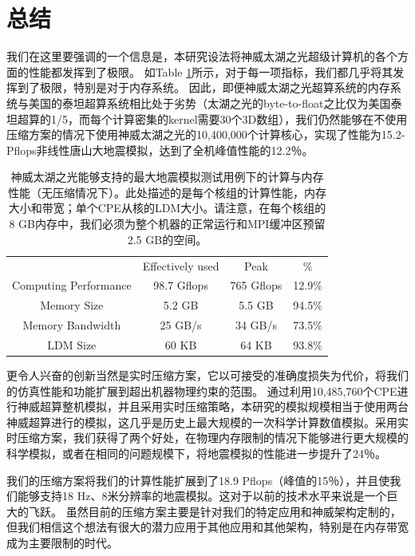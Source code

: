 \documentclass[degree=doctor]{thuthesis}
\begin{document}
\section{总结}

我们在这里要强调的一个信息是，本研究设法将神威太湖之光超级计算机的各个方面的性能都发挥到了极限。 如Table \ref{tb:push-limit}所示，对于每一项指标，我们都几乎将其发挥到了极限，特别是对于内存系统。 因此，即便神威太湖之光超算系统的内存系统与美国的泰坦超算系统相比处于劣势（太湖之光的byte-to-float之比仅为美国泰坦超算的1/5，而每个计算密集的kernel需要30个3D数组），我们仍然能够在不使用压缩方案的情况下使用神威太湖之光的10,400,000个计算核心，实现了性能为15.2-Pflops非线性唐山大地震模拟，达到了全机峰值性能的12.2％。

\begin{table}[!t]
\caption{
神威太湖之光能够支持的最大地震模拟测试用例下的计算与内存性能（无压缩情况下）。此处描述的是每个核组的计算性能，内存大小和带宽；单个CPE从核的LDM大小。请注意，在每个核组的8 GB内存中，我们必须为整个机器的正常运行和MPI缓冲区预留2.5 GB的空间。}
\label{tb:push-limit}
\centering
\begin{tabular}{cccc}
\hline\hline
  & Effectively used & Peak & \% \\

  Computing Performance & 98.7 Gflops & 765 Gflops & 12.9\% \\
  Memory Size & 5.2 GB & 5.5 GB & 94.5\% \\
  Memory Bandwidth & 25 GB/s & 34 GB/s & 73.5\% \\
  LDM Size & 60 KB & 64 KB & 93.8\% \\\hline
\hline
\end{tabular}
\end{table}

更令人兴奋的创新当然是实时压缩方案，它以可接受的准确度损失为代价，将我们的仿真性能和功能扩展到超出机器物理约束的范围。 通过利用10,485,760个CPE进行神威超算整机模拟，并且采用实时压缩策略，本研究的模拟规模相当于使用两台神威超算进行的模拟，这几乎是历史上最大规模的一次科学计算数值模拟。采用实时压缩方案，我们获得了两个好处，在物理内存限制的情况下能够进行更大规模的科学模拟，或者在相同的问题规模下，将地震模拟的性能进一步提升了24％。

我们的压缩方案将我们的计算性能扩展到了18.9 Pflops（峰值的15％），并且使我们能够支持18 Hz、8米分辨率的地震模拟。这对于以前的技术水平来说是一个巨大的飞跃。 虽然目前的压缩方案主要是针对我们的特定应用和神威架构定制的，但我们相信这个想法有很大的潜力应用于其他应用和其他架构，特别是在内存带宽成为主要限制的时代。
\end{document}
